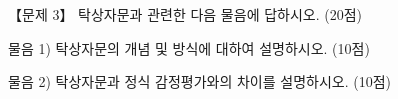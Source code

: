 \begin{longquestion}{【문제 3】}
탁상자문과 관련한 다음 물음에 답하시오. (20점) \par
\medskip\noindent 물음 1) 탁상자문의 개념 및 방식에 대하여 설명하시오. (10점) \par
\medskip\noindent 물음 2) 탁상자문과 정식 감정평가와의 차이를 설명하시오. (10점) \par
\end{longquestion}
